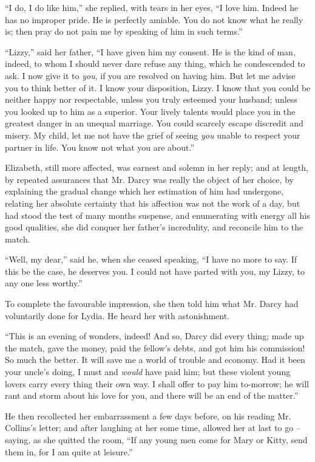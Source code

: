 “I do, I do like him,” she replied, with tears in her eyes,
“I love him. Indeed he has no improper pride. He is
perfectly amiable. You do not know what he really is;
then pray do not pain me by speaking of him in such
terms.”

“Lizzy,” said her father, “I have given him my consent.
He is the kind of man, indeed, to whom I should never
dare refuse any thing, which he condescended to ask.
I now give it to \textit{you}, if you are resolved on having him.
But let me advise you to think better of it. I know your
disposition, Lizzy. I know that you could be neither
happy nor respectable, unless you truly esteemed your
husband; unless you looked up to him as a superior.
Your lively talents would place you in the greatest danger
in an unequal marriage. You could scarcely escape discredit
and misery. My child, let me not have the grief
of seeing \textit{you} unable to respect your partner in life. You
know not what you are about.”

Elizabeth, still more affected, was earnest and solemn
in her reply; and at length, by repeated assurances that
Mr. Darcy was really the object of her choice, by explaining
the gradual change which her estimation of him had
undergone, relating her absolute certainty that his affection
was not the work of a day, but had stood the test
of many months suspense, and enumerating with energy
all his good qualities, she did conquer her father’s incredulity,
and reconcile him to the match.

“Well, my dear,” said he, when she ceased speaking,
“I have no more to say. If this be the case, he deserves
you. I could not have parted with you, my Lizzy, to
any one less worthy.”

To complete the favourable impression, she then told
him what Mr. Darcy had voluntarily done for Lydia.
He heard her with astonishment.

“This is an evening of wonders, indeed! And so,
Darcy did every thing; made up the match, gave the
money, paid the fellow’s debts, and got him his commission!
So much the better. It will save me a world
of trouble and economy. Had it been your uncle’s doing,
I must and \textit{would} have paid him; but these violent young
lovers carry every thing their own way. I shall offer to
pay him to-morrow; he will rant and storm about his
love for you, and there will be an end of the matter.”

He then recollected her embarrassment a few days
before, on his reading Mr. Collins’s letter; and after
laughing at her some time, allowed her at last to go -- saying,
as she quitted the room, “If any young men come
for Mary or Kitty, send them in, for I am quite at leisure.”

